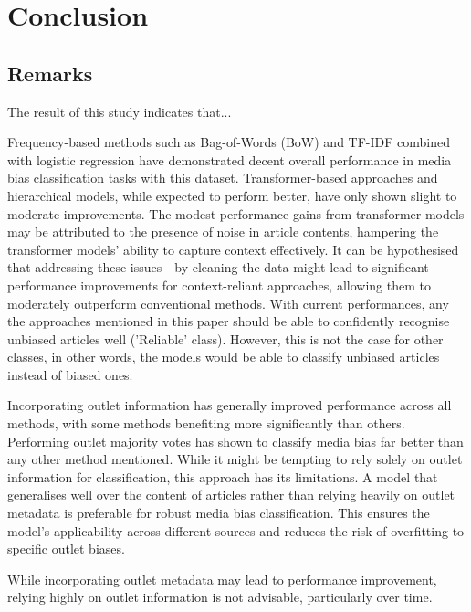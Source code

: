 \chapter{Conclusion}
\label{cha:6}

\section{Remarks}

The result of this study indicates that...

Frequency-based methods such as Bag-of-Words (BoW) and TF-IDF combined with logistic regression have demonstrated decent overall performance in media bias classification tasks with this dataset. Transformer-based approaches and hierarchical models, while expected to perform better, have only shown slight to moderate improvements. The modest performance gains from transformer models may be attributed to the presence of noise in article contents, hampering the transformer models' ability to capture context effectively. It can be hypothesised that addressing these issues—by cleaning the data might lead to significant performance improvements for context-reliant approaches, allowing them to moderately outperform conventional methods. With current performances, any the approaches mentioned in this paper should be able to confidently recognise unbiased articles well ('Reliable' class). However, this is not the case for other classes, in other words, the models would be able to classify unbiased articles instead of biased ones.

Incorporating outlet information has generally improved performance across all methods, with some methods benefiting more significantly than others. Performing outlet majority votes has shown to classify media bias far better than any other method mentioned. While it might be tempting to rely solely on outlet information for classification, this approach has its limitations. A model that generalises well over the content of articles rather than relying heavily on outlet metadata is preferable for robust media bias classification. This ensures the model's applicability across different sources and reduces the risk of overfitting to specific outlet biases.

While incorporating outlet metadata may lead to performance improvement, relying highly on outlet information is not advisable, particularly over time.

\begin{comment}
This seems a weird way of phrasing this. Of course relying on outlet is not a
reliable classifier, especially over time! It would be a completely useless tool too
as you don't need to run a model anymore, you can just tell the users how
trustworthy each outlet is. Which means outlets can't evolve...
I think this can be worded very differently.
\end{comment}

